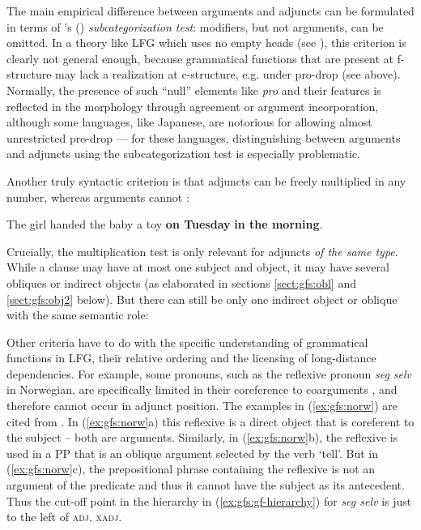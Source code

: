 \documentclass[output=paper]{../langscibook}
\begin{document}
 The main empirical difference between arguments and adjuncts can be formulated in terms of \citeauthor{dowty1982}'s (\citeyear{dowty1982}) \textit{subcategorization test}: modifiers, but not arguments, can be omitted. In a theory like LFG which uses no empty heads (see ), this criterion is clearly not general enough, because grammatical functions that are present at f-structure may lack a realization at c-structure, e.g. under pro-drop (see  above). Normally, the presence of such ``null'' elements like \textit{pro} and their features is reflected in the morphology through agreement or argument incorporation, although some languages, like Japanese, are notorious for allowing almost unrestricted pro-drop --- for these languages, distinguishing between arguments and adjuncts using the subcategorization test is especially problematic.
 
 Another truly syntactic criterion is that adjuncts can be freely multiplied in any number, whereas arguments cannot \citep[40]{kaplanbresnan82}:
 
 \ea
    The girl handed the baby a toy \textbf{on Tuesday}\textsubscript{\ADJ} \textbf{in the morning}\textsubscript{\ADJ}.
    
 \z
  Crucially, the multiplication test is only relevant for adjuncts \textit{of the same type}. While a clause may have at most one subject and object, it may have several obliques or indirect objects (as elaborated in sections \ref{sect:gfs:obl} and \ref{sect:gfs:obj2} below). But there can still be only one indirect object or oblique with the same semantic role:
 
 \z
 
 Other criteria have to do with the specific understanding of grammatical functions in LFG, their relative ordering and the licensing of long-distance dependencies. For example, some pronouns, such as the reflexive pronoun \textit{seg selv} in Norwegian, are specifically limited in their coreference to coarguments \citep{Hellan88}, and therefore cannot occur in adjunct position. The examples in (\ref{ex:gfs:norw}) are cited from \citet{DLM:LFG}. In (\ref{ex:gfs:norw}a) this reflexive is a direct object that is coreferent to the subject -- both are arguments. Similarly, in (\ref{ex:gfs:norw}b), the reflexive is used in a PP that is an oblique argument selected by the verb `tell'. But in (\ref{ex:gfs:norw}c), the prepositional phrase containing the reflexive is not an argument of the predicate and thus it cannot have the subject as its antecedent. Thus the cut-off point in the hierarchy in (\ref{ex:gfs:gf-hierarchy}) for \textit{seg selv} is just to the left of \textsc{adj, xadj}.
 
\end{document}

